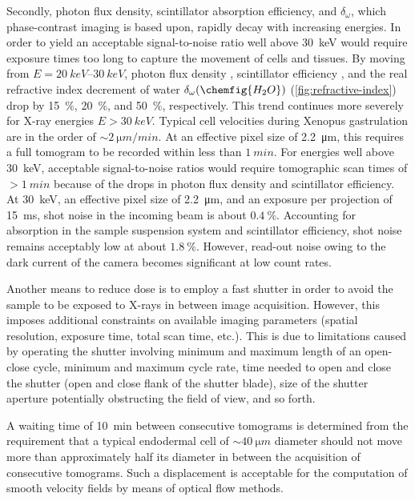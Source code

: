 \documentclass[
twoside,
openright,
titlepage,
numbers=noenddot,
headinclude,
fleqn,
a4paper,
footinclude=true,
cleardoublepage=empty,
abstractoff,
BCOR=5mm,
paper=a4,
fontsize=11pt,
british,ngerman,american,
]{scrreprt}
\begin{document}
Secondly, photon flux density, scintillator absorption efficiency, and
$\delta_\omega$, which phase-contrast imaging is based upon, rapidly
decay with increasing energies.  In order to yield an acceptable
signal-to-noise ratio well above \SI{30}{keV} would require exposure
times too long to capture the movement of cells and tissues.  By
moving from $E = \SIrange{20}{30}{keV}$, photon flux density
\cite{Henke1993}, scintillator efficiency \cite{Martin2009}, and the
real refractive index decrement of water
$\delta_\omega(\chemfig{H_2O})$ (\cref{fig:refractive-index}) drop by
\SI{15}{\percent}, \SI{20}{\percent}, and \SI{50}{\percent},
respectively.  This trend continues more severely for X-ray energies
$E > \SI{30}{keV}$.  Typical cell velocities during Xenopus
gastrulation are in the order of $\sim\SI{2}{\micro m/min}$.  At an
effective pixel size of \SI{2.2}{\micro m}, this requires a full
tomogram to be recorded within less than $\SI{1}{min}$.  For energies
well above \SI{30}{keV}, acceptable signal-to-noise ratios would
require tomographic scan times of $>\SI{1}{min}$ because of the drops
in photon flux density and scintillator efficiency.  At \SI{30}{keV},
an effective pixel size of \SI{2.2}{\micro m}, and an exposure per
projection of \SI{15}{ms}, shot noise in the incoming beam is about
$\SI{0.4}{\percent}$.  Accounting for absorption in the sample
suspension system and scintillator efficiency, shot noise remains
acceptably low at about $\SI{1.8}{\percent}$.  However, read-out noise
owing to the dark current of the camera becomes significant at low
count rates.

Another means to reduce dose is to employ a fast shutter in order to
avoid the sample to be exposed to X-rays in between image acquisition.
However, this imposes additional constraints on available imaging
parameters (spatial resolution, exposure time, total scan time, etc.).
This is due to limitations caused by operating the shutter involving
minimum and maximum length of an open-close cycle, minimum and maximum
cycle rate, time needed to open and close the shutter (open and close
flank of the shutter blade), size of the shutter aperture potentially
obstructing the field of view, and so forth.

A waiting time of \SI{10}{min} between consecutive tomograms is
determined from the requirement that a typical endodermal cell of
$\sim\SI{40}{\micro m}$ diameter should not move more than
approximately half its diameter in between the acquisition of
consecutive tomograms.  Such a displacement is acceptable for the
computation of smooth velocity fields by means of optical flow
methods.
\end{document}
